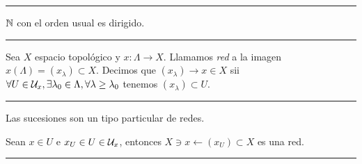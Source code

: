 \E

\hrule 
\begin{example}
    \(\mathbb{N}\) con el orden usual es dirigido. 
\end{example}
\hrule 

\E

\begin{definition}
    Sea \(X\) espacio topológico y \(x:\Lambda\to X\). Llamamos \emph{red} a la imagen \(x(\Lambda) = (x_\lambda)\subset X \). Decimos que \((x_\lambda) \to x \in X\) sii \(\forall U \in \mathcal{U}_x,\exists \lambda_0\in \Lambda, \forall \lambda \geq \lambda_0\) tenemos \((x_\lambda)\subset U\).   
\end{definition}

\E

\hrule 
\begin{example}
    Las sucesiones son un tipo particular de redes.   
\end{example}
\begin{example}
    Sean \(x\in U \) e \(x_U\in U\in \mathcal{U}_x\), entonces \(X\ni x\leftarrow(x_U)\subset X\) es una red.   
\end{example}
\hrule

\E

